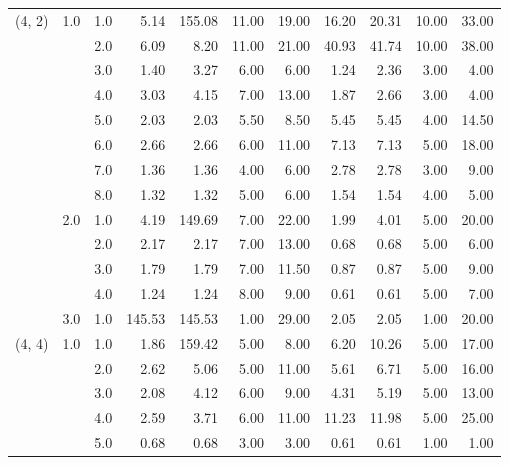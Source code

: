 \begin{tabular}{lllrrrrrrrr}
(4, 2) & 1.0 & 1.0  &       5.14 &    155.08 & 11.00 &  19.00 &      16.20 &     20.31 & 10.00 &  33.00 \\
       &     & 2.0  &       6.09 &      8.20 & 11.00 &  21.00 &      40.93 &     41.74 & 10.00 &  38.00 \\
       &     & 3.0  &       1.40 &      3.27 &  6.00 &   6.00 &       1.24 &      2.36 &  3.00 &   4.00 \\
       &     & 4.0  &       3.03 &      4.15 &  7.00 &  13.00 &       1.87 &      2.66 &  3.00 &   4.00 \\
       &     & 5.0  &       2.03 &      2.03 &  5.50 &   8.50 &       5.45 &      5.45 &  4.00 &  14.50 \\
       &     & 6.0  &       2.66 &      2.66 &  6.00 &  11.00 &       7.13 &      7.13 &  5.00 &  18.00 \\
       &     & 7.0  &       1.36 &      1.36 &  4.00 &   6.00 &       2.78 &      2.78 &  3.00 &   9.00 \\
       &     & 8.0  &       1.32 &      1.32 &  5.00 &   6.00 &       1.54 &      1.54 &  4.00 &   5.00 \\
       & 2.0 & 1.0  &       4.19 &    149.69 &  7.00 &  22.00 &       1.99 &      4.01 &  5.00 &  20.00 \\
       &     & 2.0  &       2.17 &      2.17 &  7.00 &  13.00 &       0.68 &      0.68 &  5.00 &   6.00 \\
       &     & 3.0  &       1.79 &      1.79 &  7.00 &  11.50 &       0.87 &      0.87 &  5.00 &   9.00 \\
       &     & 4.0  &       1.24 &      1.24 &  8.00 &   9.00 &       0.61 &      0.61 &  5.00 &   7.00 \\
       & 3.0 & 1.0  &     145.53 &    145.53 &  1.00 &  29.00 &       2.05 &      2.05 &  1.00 &  20.00 \\
(4, 4) & 1.0 & 1.0  &       1.86 &    159.42 &  5.00 &   8.00 &       6.20 &     10.26 &  5.00 &  17.00 \\
       &     & 2.0  &       2.62 &      5.06 &  5.00 &  11.00 &       5.61 &      6.71 &  5.00 &  16.00 \\
       &     & 3.0  &       2.08 &      4.12 &  6.00 &   9.00 &       4.31 &      5.19 &  5.00 &  13.00 \\
       &     & 4.0  &       2.59 &      3.71 &  6.00 &  11.00 &      11.23 &     11.98 &  5.00 &  25.00 \\
       &     & 5.0  &       0.68 &      0.68 &  3.00 &   3.00 &       0.61 &      0.61 &  1.00 &   1.00 \\

\end{tabular}
